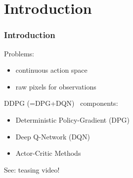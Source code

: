 \section{Introduction}

\begin{frame}
\frametitle{Introduction}
Problems:
\begin{itemize}
  \item continuous action space
  \item raw pixels for observations
\end{itemize}
\vspace{5mm}

DDPG (=DPG+DQN)~\cite{Lillicrap2015} components:
\begin{itemize}
  \item Deterministic Policy-Gradient (DPG) \cite{Silver2014}
  \item Deep Q-Network (DQN) \cite{Mnih2013}
  \item Actor-Critic Methods \cite{Sutton1998}
\end{itemize}

\vspace{5mm}
See: teasing video!
\end{frame}



